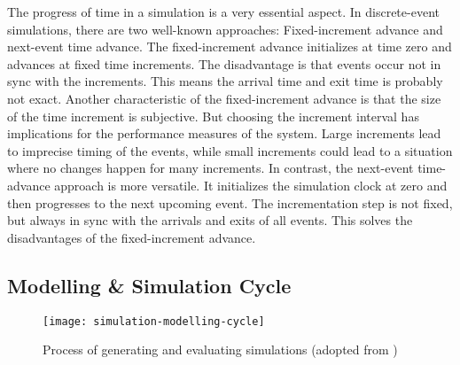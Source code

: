 The progress of time in a simulation is a very essential aspect. In discrete-event simulations, there are two well-known approaches: Fixed-increment advance and next-event time advance.
The fixed-increment advance initializes at time zero and advances at fixed time increments. The disadvantage is that events occur not in sync with the increments. This means the arrival time and exit time is probably not exact. Another characteristic of the fixed-increment advance is that the size of the time increment is subjective. But choosing the increment interval has implications for the performance measures of the system. Large increments lead to imprecise timing of the events, while small increments could lead to a situation where no changes happen for many increments.
In contrast, the next-event time-advance approach is more versatile. It initializes the simulation clock at zero and then progresses to the next upcoming event. The incrementation step is not fixed, but always in sync with the arrivals and exits of all events. This solves the disadvantages of the fixed-increment advance.





\subsection{Modelling \& Simulation Cycle}

\begin{figure}[h!]
 \caption{Process of generating and evaluating simulations (adopted from \cite[page ]{sokolowski2010modeling})}
\texttt{[image: simulation-modelling-cycle]}
\end{figure}


